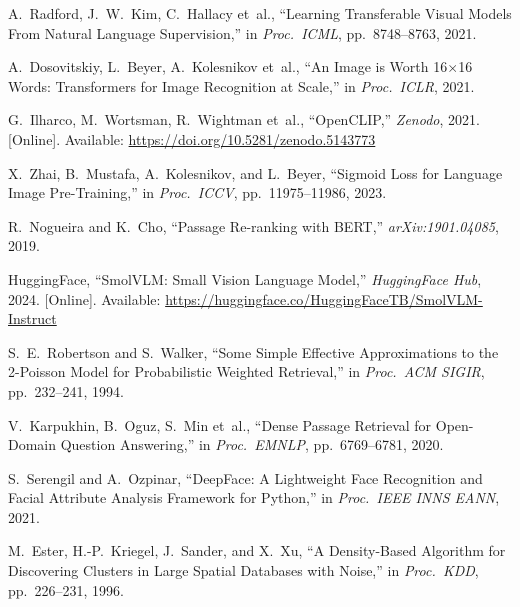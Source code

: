 \documentclass[12pt,a4paper,oneside]{report}
\begin{document}
\begin{enumerate}[label={[\arabic*]}, leftmargin=2.2em]

\item A.~Radford, J.~W.~Kim, C.~Hallacy et~al.,
  ``Learning Transferable Visual Models From Natural Language
  Supervision,''
  in \textit{Proc.\ ICML}, pp.~8748--8763, 2021.

\item A.~Dosovitskiy, L.~Beyer, A.~Kolesnikov et~al.,
  ``An Image is Worth 16$\times$16 Words: Transformers for Image
  Recognition at Scale,''
  in \textit{Proc.\ ICLR}, 2021.

\item G.~Ilharco, M.~Wortsman, R.~Wightman et~al.,
  ``OpenCLIP,''
  \textit{Zenodo}, 2021.
  [Online]. Available: \url{https://doi.org/10.5281/zenodo.5143773}

\item X.~Zhai, B.~Mustafa, A.~Kolesnikov, and L.~Beyer,
  ``Sigmoid Loss for Language Image Pre-Training,''
  in \textit{Proc.\ ICCV}, pp.~11975--11986, 2023.

\item R.~Nogueira and K.~Cho,
  ``Passage Re-ranking with BERT,''
  \textit{arXiv:1901.04085}, 2019.

\item HuggingFace,
  ``SmolVLM: Small Vision Language Model,''
  \textit{HuggingFace Hub}, 2024.
  [Online]. Available: \url{https://huggingface.co/HuggingFaceTB/SmolVLM-Instruct}

\item S.~E.~Robertson and S.~Walker,
  ``Some Simple Effective Approximations to the 2-Poisson Model for
  Probabilistic Weighted Retrieval,''
  in \textit{Proc.\ ACM SIGIR}, pp.~232--241, 1994.

\item V.~Karpukhin, B.~Oguz, S.~Min et~al.,
  ``Dense Passage Retrieval for Open-Domain Question Answering,''
  in \textit{Proc.\ EMNLP}, pp.~6769--6781, 2020.

\item S.~Serengil and A.~Ozpinar,
  ``DeepFace: A Lightweight Face Recognition and Facial Attribute
  Analysis Framework for Python,''
  in \textit{Proc.\ IEEE INNS EANN}, 2021.

\item M.~Ester, H.-P.~Kriegel, J.~Sander, and X.~Xu,
  ``A Density-Based Algorithm for Discovering Clusters in Large Spatial
  Databases with Noise,''
  in \textit{Proc.\ KDD}, pp.~226--231, 1996.


\end{enumerate}
\end{document}

